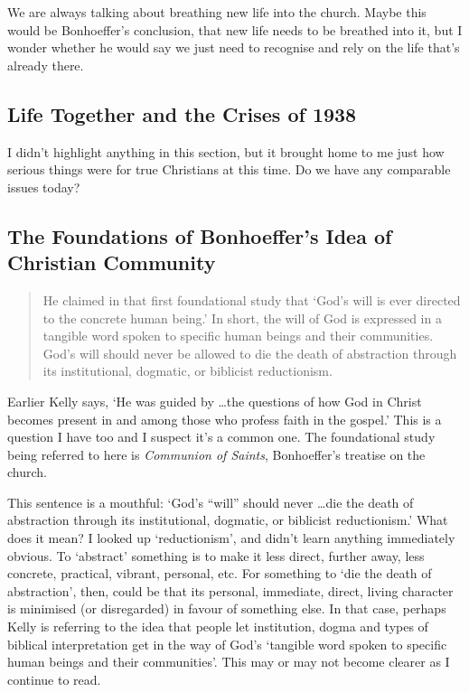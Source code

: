 We are always talking about breathing new life into the church. Maybe this would
be Bonhoeffer's conclusion, that new life needs to be breathed into it, but I
wonder whether he would say we just need to recognise and rely on the life
that's already there.

\subsection{Life Together and the Crises of 1938}

I didn't highlight anything in this section, but it brought home to me just how
serious things were for true Christians at this time. Do we have any comparable
issues today?

\subsection{The Foundations of Bonhoeffer's Idea of Christian Community}

\begin{quote}
    He claimed in that first foundational study that `God's will is ever
    directed to the concrete human being.' In short, the will of God is
    expressed in a tangible word spoken to specific human beings and their
    communities. God's will should never be allowed to die the death of
    abstraction through its institutional, dogmatic, or biblicist reductionism.
\end{quote}

Earlier Kelly says, `He was guided by \dots the questions of how God in Christ
becomes present in and among those who profess faith in the gospel.' This is a
question I have too and I suspect it's a common one. The foundational study
being referred to here is \textit{Communion of Saints}, Bonhoeffer's treatise on
the church.

This sentence is a mouthful: `God's ``will'' should never \dots die the death of
abstraction through its institutional, dogmatic, or biblicist reductionism.'
What does it mean? I looked up `reductionism', and didn't learn anything
immediately obvious. To `abstract' something is to make it less direct, further
away, less concrete, practical, vibrant, personal, etc. For something to `die
the death of abstraction', then, could be that its personal, immediate, direct,
living character is minimised (or disregarded) in favour of something else. In
that case, perhaps Kelly is referring to the idea that people let institution,
dogma and types of biblical interpretation get in the way of God's `tangible
word spoken to specific human beings and their communities'. This may or may not
become clearer as I continue to read.

